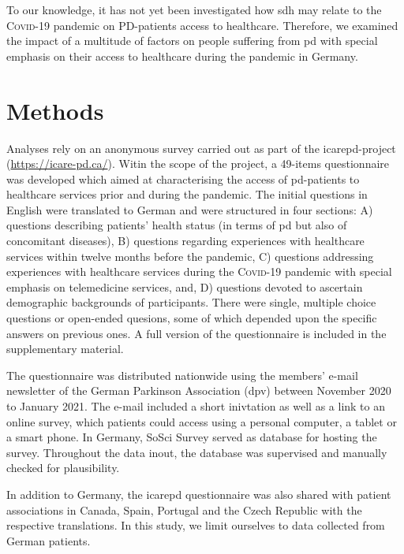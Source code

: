 \documentclass{bmcart}
\begin{document}
To our knowledge, it has not yet been investigated how \ac{sdh} may relate to the \textsc{Covid}-19 pandemic on PD-patients access to healthcare. Therefore, we examined the impact of a multitude of factors on people suffering from \ac{pd} with special emphasis on their access to healthcare during the pandemic in Germany. 

\newpage

\section*{Methods}
Analyses rely on an anonymous survey carried out as part of the \ac{icarepd}-project (\url{https://icare-pd.ca/}). Witin the scope of the project, a 49-items questionnaire was developed which aimed at characterising the access of \ac{pd}-patients to healthcare services prior and during the pandemic. The initial questions in English were translated to German and were structured in four sections: A) questions describing patients' health status (in terms of \ac{pd} but also of concomitant diseases), B) questions regarding experiences with healthcare services within twelve months before the pandemic, C) questions addressing experiences with healthcare services during the \textsc{Covid}-19 pandemic with special emphasis on telemedicine services, and, D) questions devoted to ascertain demographic backgrounds of participants. There were single, multiple choice questions or open-ended quesions, some of which depended upon the specific answers on previous ones. A full version of the questionnaire is included in the supplementary material. 

The questionnaire was distributed nationwide using the members’ e-mail newsletter of the German Parkinson Association (\ac{dpv}) between November 2020 to January 2021. The e-mail included a short inivtation as well as a link to an online survey, which patients could access using a personal computer, a tablet or a smart phone. In Germany, SoSci Survey \cite{leiner2016} served as database for hosting the survey. Throughout the data inout, the database was supervised and manually checked for plausibility. 

In addition to Germany, the \ac{icarepd} questionnaire was also shared with patient associations in Canada, Spain, Portugal and the Czech Republic with the respective translations. In this study, we limit ourselves to data collected from German patients. 

\end{document}

